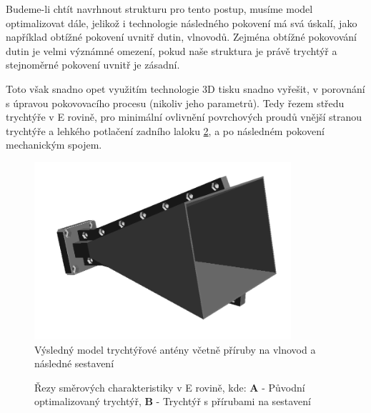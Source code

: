 Budeme-li chtít navrhnout strukturu pro tento postup, musíme model optimalizovat dále, jelikož i technologie následného pokovení má svá úskalí, jako například obtížné pokovení uvnitř dutin, vlnovodů. Zejména obtížné pokovování dutin je velmi význámné omezení, pokud naše struktura je právě trychtýř a stejnoměrné pokovení uvnitř je zásadní.

Toto však snadno opet využitím technologie 3D tisku snadno vyřešit, v porovnání s úpravou pokovovacího procesu (nikoliv jeho parametrů). Tedy řezem středu trychtýře v E rovině, pro minimální ovlivnění povrchových proudů vnější stranou trychtýře a lehkého potlačení zadního laloku \ref{fig:hornCompareAssy}, a po následném pokovení mechanickým spojem. 

\begin{figure}[h]
\begin{center}
\includegraphics[width=9.5cm]{pics/HornAssy}
\caption{Výsledný model trychtýřové antény včetně příruby na vlnovod a následné sestavení}
\label{fig:HornAssy}
\end{center}
\end{figure}

\begin{figure}
\caption{Řezy směrových charakteristiky v E rovině, kde: \textbf{A} - Původní optimalizovaný trychtýř, \textbf{B} - Trychtýř s přírubami na sestavení}
\label{fig:hornCompareAssy}
\end{figure}

